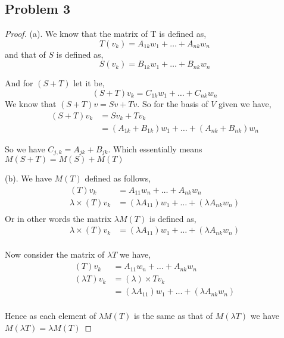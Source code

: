 \documentclass[a4paper]{report}
\begin{document}
\subsection*{Problem 3}
\begin{proof}
    (a). We know that the matrix of T is defined as, 
    $$ T(v_k) = A_{1k}w_1 + \dots + A_{nk}w_n $$ 
    and that of $S$ is defined as, 
    $$ S(v_k) =B_{1k}w_1 + \dots + B_{nk}w_n $$

    And for $(S+T)$ let it be, 
    $$ (S+T)v_k = C_{1k}w_1 + \dots + C_{nk}w_n $$ 
    We know that $(S+T)v = Sv + Tv$. So for the basis of $V$ given we have, 
    \begin{align*}
        (S+T)v_k &= Sv_k + Tv_k\\
                 &= (A_{1k}+B_{1k})w_1 + \dots + (A_{nk} + B_{nk})w_n
    \end{align*}

    So we have $C_{j,k} = A_{jk} + B_{jk}$. Which essentially means $M(S+T) = M(S) + M(T)$


    \vspace{2em}
    (b). We have $M(T)$ defined as  follows,  
    \begin{align*}
     (T) v_k  &= A_{11}w_n + \dots + A_{nk}w_n \\
     \lambda \times  (T)v_k &=  (\lambda A_{11}) w_1 + \dots + (\lambda A_{nk} w_n)\\
    \end{align*}
    Or in other words the matrix $\lambda M(T)$ is  defined as, 
    \begin{align*}
     \lambda \times  (T)v_k &=  (\lambda A_{11}) w_1 + \dots + (\lambda A_{nk} w_n)\\
    \end{align*}

    Now consider the matrix of $\lambda T$ we have, 
    \begin{align*}
     (T) v_k  &= A_{11}w_n + \dots + A_{nk}w_n \\
     (\lambda T)v_k &= (\lambda) \times  Tv_k\\
                    &= (\lambda A_{11}) w_1 + \dots + (\lambda A_{nk} w_n)\\
    \end{align*}

    Hence as each element of $\lambda M(T)$ is the same as that of $M(\lambda T)$ we have $M(\lambda T) = \lambda M(T)$


\end{proof}
\end{document}
